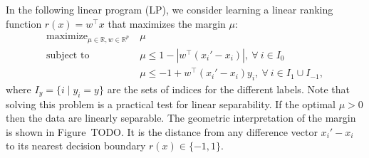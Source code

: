 \documentclass{article}
\newcommand{\RR}{\mathbb R}
\DeclareMathOperator*{\maximize}{maximize}
\begin{document}
In the following linear program (LP), we consider learning a linear
ranking function $r(x)=w^\intercal x$ that maximizes the margin $\mu$:
\begin{equation}
  \label{eq:max-margin-lp}
  \begin{aligned}
    \maximize_{\mu\in\RR, w\in\RR^p}\ & \mu \\
    \text{subject to}\ & \mu \leq 1-|w^\intercal (x_i' - x_i)|,\
    \forall\  i\in I_0\\
    &\mu \leq -1 +  w^\intercal(x_i'-x_i)y_i,\ \forall\ i\in I_1\cup I_{-1},
  \end{aligned}
\end{equation}
where $I_y=\{i\mid y_i=y\}$ are the sets of indices for the different
labels. Note that solving this problem is a practical test for linear
separability. If the optimal $\mu>0$ then the data are linearly
separable. The geometric interpretation of the margin is shown in
Figure~TODO. It is the distance from any difference vector $x_i'-x_i$
to its nearest decision boundary $r(x)\in\{-1,1\}$.
\end{document}
